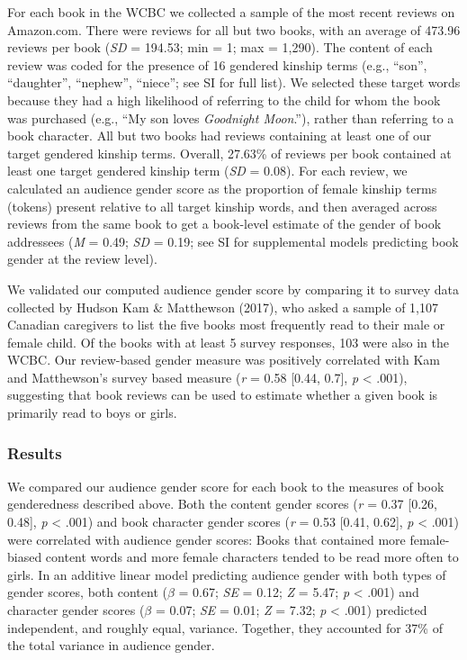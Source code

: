 \documentclass[
  english,
  ,man,floatsintext]{apa6}
\begin{document}
For each book in the WCBC we collected a sample of the most recent reviews on Amazon.com. There were reviews for all but two books, with an average of 473.96 reviews per book (\emph{SD} = 194.53; min = 1; max = 1,290). The content of each review was coded for the presence of 16 gendered kinship terms (e.g., \enquote{son}, \enquote{daughter}, \enquote{nephew}, \enquote{niece}; see SI for full list). We selected these target words because they had a high likelihood of referring to the child for whom the book was purchased (e.g., \enquote{My son loves \emph{Goodnight Moon}.}), rather than referring to a book character. All but two books had reviews containing at least one of our target gendered kinship terms. Overall, 27.63\% of reviews per book contained at least one target gendered kinship term (\emph{SD} = 0.08). For each review, we calculated an audience gender score as the proportion of female kinship terms (tokens) present relative to all target kinship words, and then averaged across reviews from the same book to get a book-level estimate of the gender of book addressees (\emph{M} = 0.49; \emph{SD} = 0.19; see SI for supplemental models predicting book gender at the review level).

We validated our computed audience gender score by comparing it to survey data collected by Hudson Kam \& Matthewson (2017), who asked a sample of 1,107 Canadian caregivers to list the five books most frequently read to their male or female child. Of the books with at least 5 survey responses, 103 were also in the WCBC. Our review-based gender measure was positively correlated with Kam and Matthewson's survey based measure (\emph{r} = 0.58 {[}0.44, 0.7{]}, \emph{p} \textless{} .001), suggesting that book reviews can be used to estimate whether a given book is primarily read to boys or girls.

\hypertarget{results-2}{%
\subsubsection{Results}\label{results-2}}

We compared our audience gender score for each book to the measures of book genderedness described above. Both the content gender scores (\emph{r} = 0.37 {[}0.26, 0.48{]}, \emph{p} \textless{} .001) and book character gender scores (\emph{r} = 0.53 {[}0.41, 0.62{]}, \emph{p} \textless{} .001) were correlated with audience gender scores: Books that contained more female-biased content words and more female characters tended to be read more often to girls. In an additive linear model predicting audience gender with both types of gender scores, both content (\(\beta\) = 0.67; \emph{SE} = 0.12; \emph{Z} = 5.47; \emph{p} \textless{} .001) and character gender scores (\(\beta\) = 0.07; \emph{SE} = 0.01; \emph{Z} = 7.32; \emph{p} \textless{} .001) predicted independent, and roughly equal, variance. Together, they accounted for 37\% of the total variance in audience gender.
\end{document}
